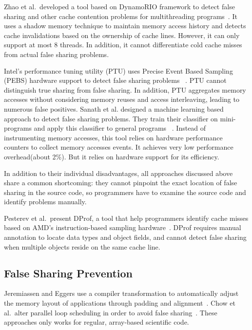 Zhao et al.\ developed a tool based on DynamoRIO framework to detect false sharing and other cache contention problems
for multithreading programs~\cite{qinzhao}. 
It uses a shadow memory technique to maintain memory access history and detects cache invalidations based on the ownership of cache lines. However, it can only support at most $8$ threads. In addition, it cannot differentiate cold cache misses from actual false sharing problems.

Intel's performance tuning utility (PTU) uses Precise Event Based Sampling (PEBS) hardware support to detect false sharing problems ~\cite{detect:ptu, detect:intel}.  PTU cannot distinguish true sharing from false sharing. In addition, PTU aggregates memory accesses without considering memory reuses and access interleaving, leading to numerous false positives. Sanath et al. designed a machine learning based approach to detect false sharing problems. They train their classifier on mini-programs and apply this classifier to general programs ~\cite{mldetect}. Instead of instrumenting memory accesses, this tool relies on hardware performance counters to collect memory accesses events. It achieves very low performance overhead(about 2\%). But it relies on hardware support for its efficiency.  

In addition to their individual disadvantages,
all approaches discussed above share a common shortcoming:  
they cannot pinpoint the exact location of false sharing in the source code, so programmers have to examine the source code and identify problems manually.

Pesterev et al.\ present DProf, a tool that help programmers identify cache misses based on AMD's instruction-based sampling hardware~\cite{DProf}. DProf requires manual annotation to locate data types and object fields, and cannot detect false sharing when multiple objects reside on the same cache line.

\subsection{False Sharing Prevention}
\label{sec:fspreventwork}
Jeremiassen and Eggers use a compiler transformation to automatically adjust the memory layout of applications through padding and alignment~\cite{falseshare:compile}. Chow et al.\ alter parallel loop scheduling in order to avoid false
sharing~\cite{falseshare:schedule}. These approaches only works for regular, array-based scientific code.

